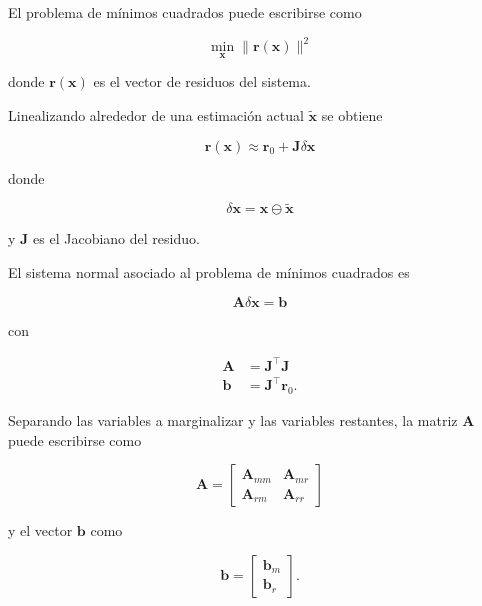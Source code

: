 El problema de mínimos cuadrados puede escribirse como

\begin{equation}
\min_{\mathbf{x}}
\|\mathbf{r}(\mathbf{x})\|^2
\end{equation}

\noindent donde $\mathbf{r}(\mathbf{x})$ es el vector de residuos del sistema.

Linealizando alrededor de una estimación actual $\tilde{\mathbf{x}}$ se obtiene

\begin{equation}
\mathbf{r}(\mathbf{x})
\approx
\mathbf{r}_0 + \mathbf{J}\delta\mathbf{x}
\end{equation}

\noindent donde

\begin{equation}
\delta\mathbf{x} =
\mathbf{x} \ominus \tilde{\mathbf{x}}
\end{equation}

\noindent y $\mathbf{J}$ es el Jacobiano del residuo.

El sistema normal asociado al problema de mínimos cuadrados es

\begin{equation}
\mathbf{A}\delta\mathbf{x} = \mathbf{b}
\end{equation}

\noindent con

\begin{align}
\mathbf{A} &= \mathbf{J}^\top \mathbf{J} \\
\mathbf{b} &= \mathbf{J}^\top \mathbf{r}_0.
\end{align}

Separando las variables a marginalizar y las variables restantes, la matriz 
$\mathbf{A}$ puede escribirse como

\begin{equation}
\mathbf{A} =
\begin{bmatrix}
\mathbf{A}_{mm} & \mathbf{A}_{mr} \\
\mathbf{A}_{rm} & \mathbf{A}_{rr}
\end{bmatrix}
\end{equation}

\noindent y el vector $\mathbf{b}$ como

\begin{equation}
\mathbf{b} =
\begin{bmatrix}
\mathbf{b}_m \\
\mathbf{b}_r
\end{bmatrix}.
\end{equation}

